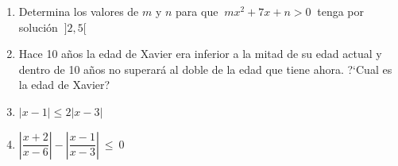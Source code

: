 \vspace{5mm}
\begin{enumerate}
\item	 Determina los valores de $m$ y $n$ para que $\ mx^2+7x+n>0\ $ tenga por solución $\ ]2,5[$

\vspace{-6mm}
\begin{flushright}
\begin{footnotesize} \textcolor{gris}{}	\end{footnotesize}
\end{flushright}

\item	Hace 10 años la edad de Xavier era inferior a la mitad de su edad actual y dentro de 10 años no superará al doble de la edad que tiene ahora. ?`Cual es la edad de Xavier?

\vspace{-6mm}
\begin{flushright}
\begin{footnotesize} \textcolor{gris}{}	\end{footnotesize}
\end{flushright}


\item	$|x-1| \leqslant 2|x-3|$

\vspace{-6mm}
\begin{flushright}
\begin{footnotesize} \textcolor{gris}{}	\end{footnotesize}
\end{flushright}

\vspace{-12mm}
\begin{flushright}
\begin{tiny} \textcolor{gris}{}	\end{tiny}
\end{flushright}

\item	$\left| \dfrac{x+2}{x-6} \right| - \left| \dfrac{x-1}{x-3} \right| \ \leqslant \ 0$


\end{enumerate}
